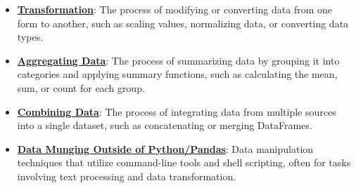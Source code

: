 \documentclass{article}%
\begin{document}
\begin{itemize}[leftmargin=*]
\item \href{https://purdue.brightspace.com/d2l/common/assets/pdfjs-d2l-dist/1.0.14-legacy/web/viewer.html?file=\%2Fcontent\%2Fenforced\%2F1095465-WL.202510.CS24200.LE1\%2F06L3-wrangling.pdf\%3Fou\%3D1095465\&lang=en-us\&container=d2l-fileviewer-rendered-pdf\&fullscreen=d2l-fileviewer-rendered-pdf-dialog\&height=667#page=43}{\textbf{Transformation}}: The process of modifying or converting data from one form to another, such as scaling values, normalizing data, or converting data types.%
\item \href{https://purdue.brightspace.com/d2l/common/assets/pdfjs-d2l-dist/1.0.14-legacy/web/viewer.html?file=\%2Fcontent\%2Fenforced\%2F1095465-WL.202510.CS24200.LE1\%2F06L3-wrangling.pdf\%3Fou\%3D1095465\&lang=en-us\&container=d2l-fileviewer-rendered-pdf\&fullscreen=d2l-fileviewer-rendered-pdf-dialog\&height=667#page=51}{\textbf{Aggregating Data}}: The process of summarizing data by grouping it into categories and applying summary functions, such as calculating the mean, sum, or count for each group.%
\item \href{https://purdue.brightspace.com/d2l/common/assets/pdfjs-d2l-dist/1.0.14-legacy/web/viewer.html?file=\%2Fcontent\%2Fenforced\%2F1095465-WL.202510.CS24200.LE1\%2F06L3-wrangling.pdf\%3Fou\%3D1095465\&lang=en-us\&container=d2l-fileviewer-rendered-pdf\&fullscreen=d2l-fileviewer-rendered-pdf-dialog\&height=667#page=56}{\textbf{Combining Data}}: The process of integrating data from multiple sources into a single dataset, such as concatenating or merging DataFrames.%
\item \href{https://purdue.brightspace.com/d2l/common/assets/pdfjs-d2l-dist/1.0.14-legacy/web/viewer.html?file=\%2Fcontent\%2Fenforced\%2F1095465-WL.202510.CS24200.LE1\%2F06L3-wrangling.pdf\%3Fou\%3D1095465\&lang=en-us\&container=d2l-fileviewer-rendered-pdf\&fullscreen=d2l-fileviewer-rendered-pdf-dialog\&height=667#page=79}{\textbf{Data Munging Outside of Python/Pandas}}: Data manipulation techniques that utilize command-line tools and shell scripting, often for tasks involving text processing and data transformation.%
\end{itemize}%
\end{document}
